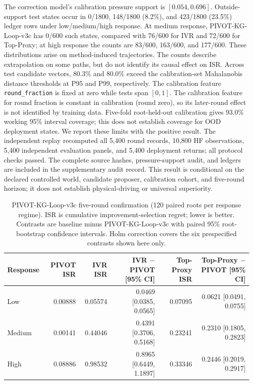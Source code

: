 \documentclass{article}
\begin{document}
The correction model's calibration pressure support is $[0.054,0.696]$.
Outside-support test states occur in 0/1800, 148/1800 (8.2\%), and 423/1800
(23.5\%) ledger rows under low/medium/high response. At medium response,
PIVOT-KG-Loop-v3c has 0/600 such states, compared with 76/600 for IVR and 72/600 for
Top-Proxy; at high response the counts are 83/600, 163/600, and 177/600.
These distributions arise on method-induced trajectories. The counts describe
extrapolation on some paths, but do not identify its causal effect on ISR.
Across test candidate vectors, 80.3\% and 80.0\% exceed the calibration-set
Mahalanobis distance thresholds at P95 and P99, respectively. The calibration
feature \texttt{round\_fraction} is fixed at zero while tests span $[0,1]$.
The calibration feature for round fraction is constant in calibration
(round zero), so its later-round effect is not identified by training data.
Five-fold root-held-out calibration gives 93.0\% working 95\% interval
coverage; this does not establish coverage for OOD deployment states. We report
these limits with the positive result. The independent replay
recomputed all 5,400 round records, 10,800 HF observations, 5,400 independent
evaluation panels, and 5,400 deployment returns; all protocol checks passed.
The complete source hashes, pressure-support audit, and ledgers are included
in the supplementary audit record. This result is conditional on the declared
controlled world, candidate proposer, calibration cohort, and five-round
horizon; it does not establish physical-driving or universal superiority.

\begin{table}[!htbp]
  \centering
  \scriptsize
  \setlength{\tabcolsep}{4pt}
  \caption{PIVOT-KG-Loop-v3c five-round confirmation (120 paired roots per
  response regime). ISR is cumulative improvement-selection regret; lower is
  better. Contrasts are baseline minus PIVOT-KG-Loop-v3c with paired 95\%
  root-bootstrap confidence intervals. Holm correction covers the six
  prespecified contrasts shown here only.}
  \label{tab:multiround-confirmation}
  \begin{tabular}{lrrrrr}
    \toprule
    Response & PIVOT ISR & IVR ISR & IVR $-$ PIVOT [95\% CI] & Top-Proxy ISR & Top-Proxy $-$ PIVOT [95\% CI] \\
    \midrule
    Low    & 0.00888 & 0.05574 & 0.0469 [0.0385, 0.0565] & 0.07095 & 0.0621 [0.0491, 0.0755] \\
    Medium & 0.00141 & 0.44046 & 0.4391 [0.3706, 0.5168] & 0.23241 & 0.2310 [0.1805, 0.2823] \\
    High   & 0.08886 & 0.98532 & 0.8965 [0.6449, 1.1897] & 0.33346 & 0.2446 [0.2019, 0.2917] \\
    \bottomrule
  \end{tabular}
\end{table}
\end{document}
